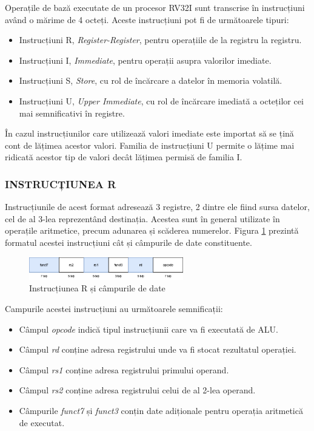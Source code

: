 \documentclass[12pt]{article}
\begin{document}
Operațile de bază executate de un procesor RV32I sunt transcrise în instrucțiuni având o mărime de 4 octeți. Aceste instrucțiuni pot fi de următoarele tipuri:

\begin{itemize}
\item Instrucțiuni R, \textit{Register-Register}, pentru operațiile de la registru la registru.
\item Instrucțiuni I, \textit{Immediate}, pentru operații asupra valorilor imediate.
\item Instrucțiuni S, \textit{Store}, cu rol de încărcare a datelor în memoria volatilă.
\item Instrucțiuni U, \textit{Upper Immediate}, cu rol de încărcare imediată a octeților cei mai semnificativi în registre.
\end{itemize}

În cazul instrucțiunilor care utilizează valori imediate este importat să se țină cont de lățimea acestor valori. Familia de instrucțiuni U permite o lățime mai ridicată acestor tip de valori decât lățimea permisă de familia I.

\subsubsection{INSTRUCȚIUNEA R}
Instrucțiunile de acest format adresează 3 registre, 2 dintre ele fiind sursa datelor, cel de al 3-lea reprezentând destinația. Acestea sunt în general utilizate în operațile aritmetice, precum adunarea și scăderea numerelor. Figura \ref{Figura:10} prezintă formatul acestei instrucțiuni cât și câmpurile de date constituente.



 \begin{figure}[h!]
 \includegraphics[width=0.6\textwidth]{rtype.drawio.png}
 \centering
 \caption{Instrucțiunea R și câmpurile de date}
 \label{Figura:10}
 \end{figure}

 Campurile acestei instrucțiuni au următoarele semnificații:
 \begin{itemize}
\item Câmpul \textit{opcode} indică tipul instrucțiunii care va fi executată de ALU.
\item Câmpul \textit{rd} conține adresa registrului unde va fi stocat rezultatul operației.
\item Câmpul \textit{rs1} conține adresa registrului primului operand.
\item Câmpul \textit{rs2} conține adresa registrului celui de al 2-lea operand.
\item Câmpurile \textit{funct7} și \textit{funct3} conțin date adiționale pentru operația aritmetică de executat.
\end{itemize}
\end{document}
